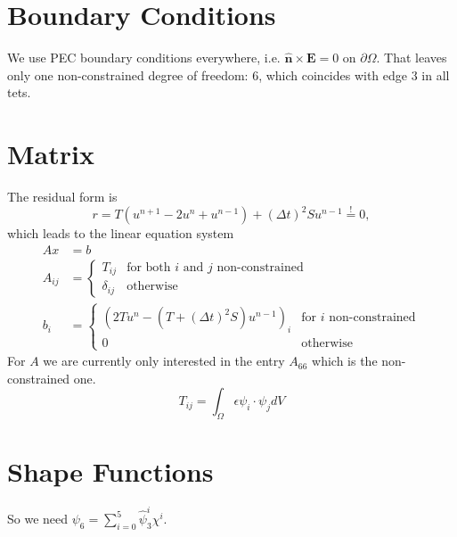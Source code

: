 \documentclass{scrartcl}
\begin{document}
\section{Boundary Conditions}

We use PEC boundary conditions everywhere, i.e. $\mathbf{\hat n}\times\mathbf
E=0$ on $\partial\Omega$.  That leaves only one non-constrained degree of
freedom: 6, which coincides with edge 3 in all tets.

\section{Matrix}

The residual form is
\begin{equation}
  r=T(u^{n+1}-2u^n+u^{n-1})+(\Delta t)^2Su^{n-1}\stackrel!=0,
\end{equation}
which leads to the linear equation system
\begin{align}
  Ax&=b \\
  A_{ij}&=\begin{cases}
    T_{ij}     &\text{for both $i$ and $j$ non-constrained} \\
    \delta_{ij}&\text{otherwise}
  \end{cases} \\
  b_i&=
  \begin{cases}
    (2Tu^n-(T+(\Delta t)^2S)u^{n-1})_i&\text{for $i$ non-constrained} \\
    0                                &\text{otherwise}
  \end{cases}
\end{align}
For $A$ we are currently only interested in the entry $A_{66}$ which is the
non-constrained one.
\begin{equation}
  T_{ij}=\int_\Omega\epsilon\psi_i\cdot\psi_jdV
\end{equation}

\section{Shape Functions}

So we need $\psi_6=\sum_{i=0}^5\hat\psi^i_3\chi^i$.
\end{document}
